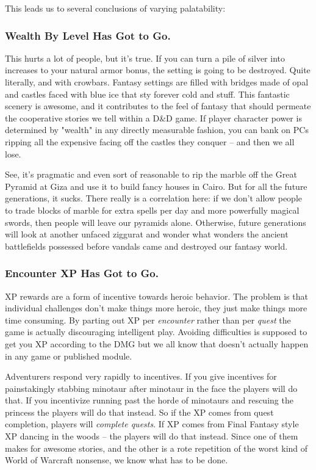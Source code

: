 This leads us to several conclusions of varying palatability:

\subsubsection{Wealth By Level Has Got to Go.}

This hurts a lot of people, but it's true. If you can turn a pile of silver into increases to your natural armor bonus, the setting is going to be destroyed. Quite literally, and with crowbars. Fantasy settings are filled with bridges made of opal and castles faced with blue ice that sty forever cold and stuff. This fantastic scenery is awesome, and it contributes to the feel of fantasy that should permeate the cooperative stories we tell within a D\&D game. If player character power is determined by "wealth" in any directly measurable fashion, you can bank on PCs ripping all the expensive facing off the castles they conquer -- and then we all lose.

See, it's pragmatic and even sort of reasonable to rip the marble off the Great Pyramid at Giza and use it to build fancy houses in Cairo. But for all the future generations, it sucks. There really is a correlation here: if we don't allow people to trade blocks of marble for extra spells per day and more powerfully magical swords, then people will leave our pyramids alone. Otherwise, future generations will look at another unfaced ziggurat and wonder what wonders the ancient battlefields possessed before vandals came and destroyed our fantasy world.

\subsubsection{Encounter XP Has Got to Go.}

XP rewards are a form of incentive towards heroic behavior. The problem is that individual challenges don't make things more heroic, they just make things more time consuming. By parting out XP per \textit{encounter} rather than per \textit{quest} the game is actually discouraging intelligent play. Avoiding difficulties is supposed to get you XP according to the DMG but we all know that doesn't actually happen in any game or published module.

Adventurers respond very rapidly to incentives. If you give incentives for painstakingly stabbing minotaur after minotaur in the face the players will do that. If you incentivize running past the horde of minotaurs and rescuing the princess the players will do that instead. So if the XP comes from quest completion, players will \textit{complete quests}. If XP comes from Final Fantasy style XP dancing in the woods -- the players will do that instead. Since one of them makes for awesome stories, and the other is a rote repetition of the worst kind of World of Warcraft nonsense, we know what has to be done.

